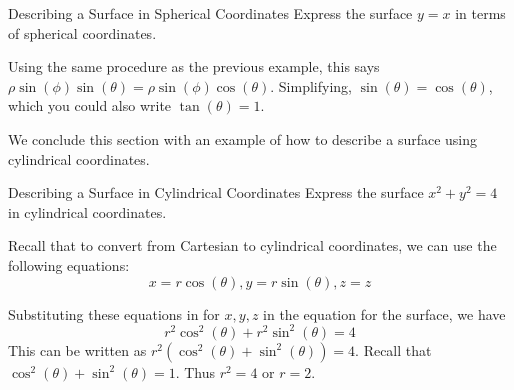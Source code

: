 \begin{example}{Describing a Surface in Spherical Coordinates}{}
Express the surface $y=x$ in terms of spherical coordinates.
\end{example}

\begin{solution}
Using the same procedure as the previous example, this says $\allowbreak \rho \sin \left( \phi \right) \sin \left( \theta
\right) =\rho \sin \left( \phi \right) \cos \left( \theta \right)$. Simplifying,  $\sin \left( \theta \right) =\cos \left( \theta \right)$, which you could also write $\tan \left( \theta \right)=1$.
\end{solution}

We conclude this section with an example of how to describe a surface using cylindrical coordinates. 

\begin{example}{Describing a Surface in Cylindrical Coordinates}{}
Express the surface $x^{2}+y^{2}=4$ in cylindrical coordinates.
\end{example}

\begin{solution}
Recall that to convert from Cartesian to cylindrical coordinates, we can use the following equations:
\[
x =r\cos \left( \theta \right) , y=r\sin \left( \theta \right) , z =z
\]

Substituting these equations in for $x,y,z$ in the equation for the surface, we have  
\[
r^{2}\cos ^{2} \left( \theta \right) +r^{2}\sin ^{2} \left( \theta \right)=4
\]
This can be written as $r^2 ( \cos^{2} \left( \theta \right)+ \sin^{2} \left(\theta\right) ) = 4$. Recall that $ \cos^{2} \left( \theta \right)+ \sin^{2} \left( \theta \right)=1$.  Thus $r^{2} = 4$ or $r=2$.
\end{solution}
